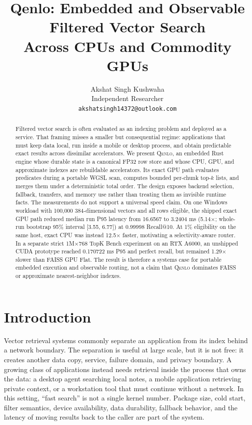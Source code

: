 \documentclass{article}
\title{Qenlo: Embedded and Observable Filtered Vector Search\\Across CPUs and Commodity GPUs}
\author{Akshat Singh Kushwaha\\
Independent Researcher\\
\texttt{akshatsingh14372@outlook.com}}
\newcommand{\qenlo}{\textsc{Qenlo}}
\begin{document}
\maketitle

\begin{abstract}
Filtered vector search is often evaluated as an indexing problem and deployed as a service.
That framing misses a smaller but consequential regime: applications that must keep data local,
run inside a mobile or desktop process, and obtain predictable exact results across dissimilar
accelerators. We present \qenlo, an embedded Rust engine whose durable state is a canonical
FP32 row store and whose CPU, GPU, and approximate indexes are rebuildable accelerators.
Its exact GPU path evaluates predicates during a portable WGSL scan, computes bounded per-chunk
top-$k$ lists, and merges them under a deterministic total order. The design exposes backend
selection, fallback, transfers, and memory use rather than treating them as invisible runtime facts.
The measurements do not support a universal speed claim. On one Windows workload with 100,000
384-dimensional vectors and all rows eligible, the shipped exact GPU path reduced median run P95
latency from 16.6567 to 3.2404 ms (5.14$\times$; whole-run bootstrap 95\% interval
[3.55, 6.77]) at 0.99998 Recall@10. At 1\% eligibility on the same host, exact CPU was instead
12.5$\times$ faster, motivating a selectivity-aware router. In a separate strict 1M$\times$768
TopK Bench experiment on an RTX A6000, an unshipped CUDA prototype reached 0.170722 ms P95 and
perfect recall, but remained 1.29$\times$ slower than FAISS GPU Flat. The result is therefore a
systems case for portable embedded execution and observable routing, not a claim that \qenlo
dominates FAISS or approximate nearest-neighbor indexes.
\end{abstract}

\section{Introduction}

Vector retrieval systems commonly separate an application from its index behind a network
boundary. The separation is useful at large scale, but it is not free: it creates another data
copy, service, failure domain, and privacy boundary. A growing class of applications instead needs
retrieval inside the process that owns the data: a desktop agent searching local notes, a mobile
application retrieving private context, or a workstation tool that must continue without a
network. In this setting, ``fast search'' is not a single kernel number. Package size, cold start,
filter semantics, device availability, data durability, fallback behavior, and the latency of
moving results back to the caller are part of the system.
\end{document}
